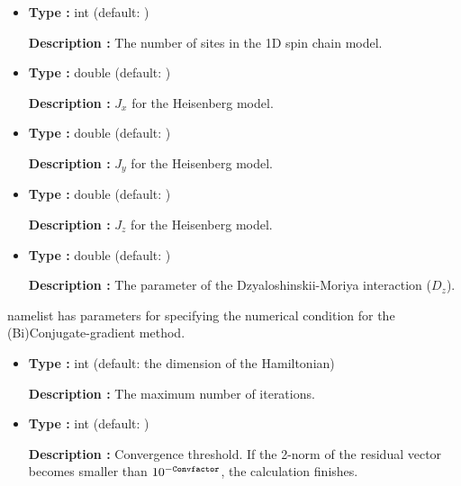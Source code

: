 \documentclass[letterpaper,10pt,dvipdfmx,openany]{sphinxmanual}
\begin{document}
\begin{itemize}
\item {} 

\textbf{Type :} int (default: )

\textbf{Description :}
The number of sites in the 1D spin chain model.

\item {} 

\textbf{Type :} double (default: )

\textbf{Description :} \(J_x\) for the Heisenberg model.

\item {} 

\textbf{Type :} double (default: )

\textbf{Description :} \(J_y\) for the Heisenberg model.

\item {} 

\textbf{Type :} double (default: )

\textbf{Description :} \(J_z\) for the Heisenberg model.

\item {} 

\textbf{Type :} double (default: )

\textbf{Description :}
The parameter of the Dzyaloshinskii-Moriya interaction (\(D_z\)).

\end{itemize}

 namelist has parameters
for specifying the numerical condition for the
(Bi)Conjugate-gradient method.
\begin{itemize}
\item {} 

\textbf{Type :} int (default: the dimension of the Hamiltonian)

\textbf{Description :} The maximum number of iterations.

\item {} 

\textbf{Type :} int (default: )

\textbf{Description :} Convergence threshold.
If the 2-norm of the residual vector becomes smaller than
\(10^{-{\tt Convfactor}}\), the calculation finishes.

\end{itemize}
\end{document}
